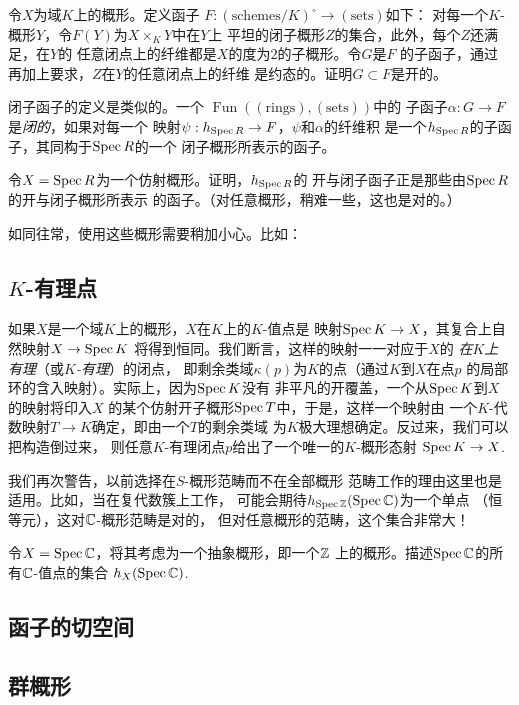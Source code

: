 \begin{exe} \label{exe:6.7}
令$X$为域$K$上的概形。定义函子
$F:(\text{schemes}/K)^\circ \to (\text{sets})$如下：
对每一个$K$-概形$Y$，令$F(Y)$为$X\times_K Y$中在$Y$上
平坦的闭子概形$Z$的集合，此外，每个$Z$还满足，在$Y$的
任意闭点上的纤维都是$X$的度为$2$的子概形。令$G$是$F$
的子函子，通过再加上要求，$Z$在$Y$的任意闭点上的纤维
是约态的。证明$G\subset F$是开的。
\end{exe}

闭子函子的定义是类似的。一个
$\operatorname{Fun}((\text{rings}),(\text{sets}))$中的
子函子$\alpha : G\to F$是\textit{闭的}，如果对每一个
映射$\psi:h_{\operatorname{Spec} R}\to F$，$\psi$和$\alpha$的纤维积
是一个$h_{\operatorname{Spec} R}$的子函子，其同构于$\operatorname{Spec} R$的一个
闭子概形所表示的函子。

\begin{exe} \label{exe:6.8}
	令$X=\operatorname{Spec} R$为一个仿射概形。证明，$h_{\operatorname{Spec} R}$的
	开与闭子函子正是那些由$\operatorname{Spec} R$的开与闭子概形所表示
	的函子。（对任意概形，稍难一些，这也是对的。）
\end{exe}

如同往常，使用这些概形需要稍加小心。比如：

\nottran


\subsection{\texorpdfstring{$K$}{K}-有理点}
\label{s:6.1.2}

如果$X$是一个域$K$上的概形，$X$在$K$上的$K$-值点是
映射$\operatorname{Spec} K\to X$，其复合上自然映射$X\to \operatorname{Spec} K$
将得到恒同。我们断言，这样的映射一一对应于$X$的
\textit{在$K$上有理}（或\textit{$K$-有理}）的闭点，
即剩余类域$\kappa(p)$为$K$的点（通过$K$到$X$在点$p$
的局部环的含入映射）。实际上，因为$\operatorname{Spec} K$没有
非平凡的开覆盖，一个从$\operatorname{Spec} K$到$X$的映射将印入$X$
的某个仿射开子概形$\operatorname{Spec} T$中，于是，这样一个映射由
一个$K$-代数映射$T\to K$确定，即由一个$T$的剩余类域
为$K$极大理想确定。反过来，我们可以把构造倒过来，
则任意$K$-有理闭点$p$给出了一个唯一的$K$-概形态射
$\operatorname{Spec} K\to X$.

我们再次警告，以前选择在$S$-概形范畴而不在全部概形
范畴工作的理由这里也是适用。比如，当在复代数簇上工作，
可能会期待$h_{\operatorname{Spec} \mathbb{Z}}(\operatorname{Spec} \mathbb{C})$为一个单点
（恒等元），这对$\mathbb{C}$-概形范畴是对的，
但对任意概形的范畴，这个集合非常大！

\begin{exe}\label{exe:6.12}
令$X=\operatorname{Spec} \mathbb{C}$，将其考虑为一个抽象概形，即一个$\mathbb{Z}$
上的概形。描述$\operatorname{Spec} \mathbb{C}$的所有$\mathbb{C}$-值点的集合
$h_X(\operatorname{Spec} \mathbb{C})$.
\end{exe}

\subsection{函子的切空间} \label{s:6.1.3}
\subsection{群概形} \label{s:6.1.4}